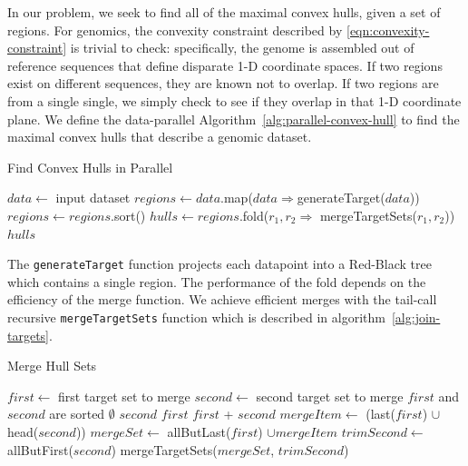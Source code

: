 \documentclass{sig-alternate}
\begin{document}
In our problem, we seek to find all of the maximal convex hulls, given a set of regions. For genomics, the
convexity constraint described by \eqref{eqn:convexity-constraint} is trivial to check: specifically, the
genome is assembled out of reference sequences that define disparate 1-D coordinate spaces. If two regions exist
on different sequences, they are known not to overlap. If two regions are from a single single, we simply check to see if
they overlap in that 1-D coordinate plane. We define the data-parallel Algorithm~\ref{alg:parallel-convex-hull} to find
the maximal convex hulls that describe a genomic dataset.

\begin{algorithm}[t]
\caption{Find Convex Hulls in Parallel}
\label{alg:parallel-convex-hull}
\begin{algorithmic}
\STATE $data \leftarrow$ input dataset
\STATE $regions \leftarrow data$.map($data \Rightarrow $generateTarget($data$))
\STATE $regions \leftarrow regions$.sort()
\STATE $hulls \leftarrow regions$.fold($r_1, r_2 \Rightarrow$ mergeTargetSets($r_1, r_2$))
\RETURN $hulls$
\end{algorithmic}
\end{algorithm}

The \texttt{generateTarget} function projects each datapoint into a Red-Black tree which contains a
single region. The performance of the fold depends on the efficiency of the merge function. We achieve
efficient merges with the tail-call recursive \texttt{mergeTargetSets} function which is described in
algorithm~\ref{alg:join-targets}.

\begin{algorithm}[b]
\caption{Merge Hull Sets}
\label{alg:join-targets}
\begin{algorithmic}
\STATE $first \leftarrow$ first target set to merge
\STATE $second \leftarrow$ second target set to merge
\REQUIRE $first$ and $second$ are sorted
\RETURN $\emptyset$
\RETURN $second$
\RETURN $first$
\ELSE
{}
\RETURN $first$ + $second$
\ELSE
\STATE $mergeItem \leftarrow$ (last($first$) $\cup$ head($second$))
\STATE $mergeSet \leftarrow$ allButLast($first$) $\cup mergeItem$
\STATE $trimSecond \leftarrow$ allButFirst($second$)
\RETURN mergeTargetSets($mergeSet$, $trimSecond$)
\ENDIF
\ENDIF
\end{algorithmic}
\end{algorithm}
\end{document}
